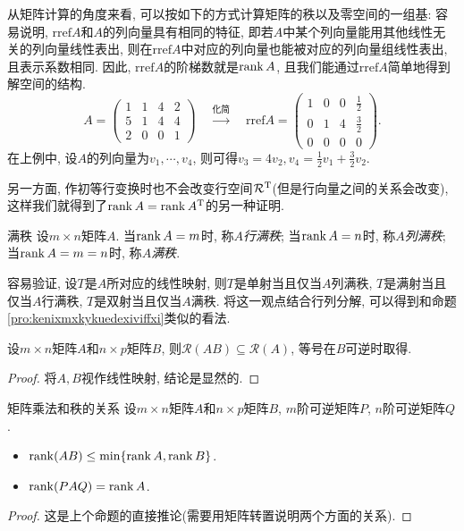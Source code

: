 从矩阵计算的角度来看, 可以按如下的方式计算矩阵的秩以及零空间的一组基: 容易说明, $\mathrm{rref}A$和$A$的列向量具有相同的特征, 即若$A$中某个列向量能用其他线性无关的列向量线性表出, 则在$\mathrm{rref}A$中对应的列向量也能被对应的列向量组线性表出, 且表示系数相同. 因此, $\mathrm{rref} A$的阶梯数就是$\operatorname{rank} A$, 且我们能通过$\mathrm{rref} A$简单地得到解空间的结构. $$A=\begin{pmatrix}
1 & 1 & 4 & 2 \\
5 & 1 & 4 & 4 \\
2 & 0 & 0 & 1 
\end{pmatrix}\quad \stackrel{\textit{化简}}{\longrightarrow} \quad \mathrm{rref}A = 
\begin{pmatrix}
1 & 0 & 0 & \frac{1}{2}  \\
0 & 1 & 4 & \frac{3}{2}  \\
0 & 0 & 0 & 0 
\end{pmatrix}.$$
在上例中, 设$A$的列向量为$v_1 , \cdots ,v_4$, 则可得$v_3=4v_2,v_4=\frac{1}{2}v_1+\frac{3}{2}v_2$. 

另一方面, 作初等行变换时也不会改变行空间$\mathcal{R^{\operatorname{T}}}$(但是行向量之间的关系会改变), 这样我们就得到了$\operatorname{rank} A = \operatorname{rank} A^{\operatorname{T}}$的另一种证明. 

\begin{definition}{满秩}
	设$m\times n$矩阵$A$. 当$\operatorname{rank} A = m$时, 称$A$\textit{行满秩}; 当$\operatorname{rank} A = n$时, 称$A$\textit{列满秩}; 当$\operatorname{rank} A = m =n$时, 称$A$\textit{满秩}. 
\end{definition}

容易验证, 设$T$是$A$所对应的线性映射, 则$T$是单射当且仅当$A$列满秩, $T$是满射当且仅当$A$行满秩, $T$是双射当且仅当$A$满秩. 将这一观点结合行列分解, 可以得到和命题\ref{pro:kenixmxkykuedexiviffxi}类似的看法. 

\begin{proposition}{}
	设$m\times n$矩阵$A$和$n\times p$矩阵$B$, 则$\mathcal{R}(AB) \subseteq \mathcal{R}(A)$, 等号在$B$可逆时取得. 
\end{proposition}
\begin{proof}
	将$A,B$视作线性映射, 结论是显然的. 
\end{proof}

\begin{proposition}{矩阵乘法和秩的关系}
	设$m\times n$矩阵$A$和$n\times p$矩阵$B$, $m$阶可逆矩阵$P$, $n$阶可逆矩阵$Q$. 
	\begin{itemize}
		\item $\operatorname{rank} (AB) \leq \min \{ \operatorname{rank} A,\operatorname{rank} B \}$. 
		\item $\operatorname{rank} (PAQ) = \operatorname{rank} A$. 
	\end{itemize}
\end{proposition}
\begin{proof}
	这是上个命题的直接推论(需要用矩阵转置说明两个方面的关系). 
\end{proof}

